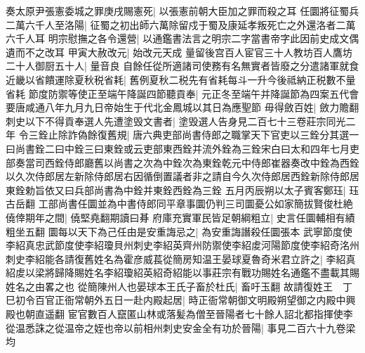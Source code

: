 奏太原尹張憲委城之罪庚戌賜憲死|{
	以張憲前朝大臣加之罪而殺之耳}
任圜將征蜀兵二萬六千人至洛陽|{
	征蜀之初出師六萬除留戍于蜀及康延孝叛死亡之外還洛者二萬六千人耳}
明宗慰撫之各令還營|{
	以通鑑書法言之明宗二字當書帝字此因前史成文偶遺而不之改耳}
甲寅大赦改元|{
	始改元天成}
量留後宫百人宦官三十人教坊百人鷹坊二十人御厨五十人|{
	量音良}
自餘任從所適諸司使務有名無實者皆廢之分遣諸軍就食近畿以省饋運除夏秋税省耗|{
	舊例夏秋二税先有省耗每斗一升今後祗納正税數不量省耗}
節度防禦等使正至端午降誕四節聽貢奉|{
	元正冬至端午并降誕節為四案五代會要唐咸通八年九月九日帝始生于代北金鳳城以其日為應聖節}
毋得斂百姓|{
	斂力贍翻}
刺史以下不得貢奉選人先遭塗毁文書者|{
	塗毁選人告身見二百七十三卷莊宗同光二年}
令三銓止除詐偽餘復舊規|{
	唐六典吏部尚書侍郎之職掌天下官吏以三銓分其選一曰尚書銓二曰中銓三曰東銓或云吏部東西銓并流外銓為三銓宋白曰太和四年七月吏部奏當司西銓侍郎廳舊以尚書之次為中銓次為東銓乾元中侍郎崔器奏改中銓為西銓以久次侍郎居左新除侍郎居右因循倒置議者非之請自今久次侍郎居西銓新除侍郎居東銓勅旨依又曰兵部尚書為中銓并東銓西銓為三銓}
五月丙辰朔以太子賓客鄭珏|{
	珏古岳翻}
工部尚書任圜並為中書侍郎同平章事圜仍判三司圜憂公如家簡拔賢俊杜絶僥倖期年之間|{
	僥堅堯翻期讀曰朞}
府庫充實軍民皆足朝綱粗立|{
	史言任圜輔相有績粗坐五翻}
圜每以天下為己任由是安重誨忌之|{
	為安重誨譖殺任圜張本}
武寧節度使李紹真忠武節度使李紹瓊貝州刺史李紹英齊州防禦使李紹䖍河陽節度使李紹奇洺州刺史李紹能各請復舊姓名為霍彦威萇從簡房知温王晏球夏魯奇米君立許之|{
	李紹真紹䖍以梁將歸降賜姓名李紹瓊紹英紹奇紹能以事莊宗有戰功賜姓名通鑑不盡載其賜姓名之由畧之也}
從簡陳州人也晏球本王氏子畜於杜氏|{
	畜吁玉翻}
故請復姓王　丁巳初令百官正衙常朝外五日一赴内殿起居|{
	時正衙常朝御文明殿朔望御之内殿中興殿也朝直遥翻}
宦官數百人竄匿山林或落髪為僧至晉陽者七十餘人詔北都指揮使李從温悉誅之從温帝之姪也帝以前相州刺史安金全有功於晉陽|{
	事見二百六十九卷梁均}


